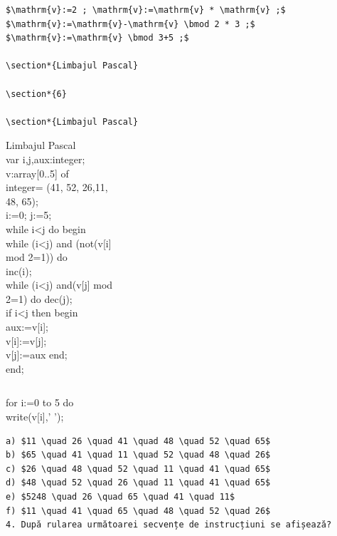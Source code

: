 \documentclass[10pt]{article}
\begin{document}
\begin{verbatim}
$\mathrm{v}:=2 ; \mathrm{v}:=\mathrm{v} * \mathrm{v} ;$
$\mathrm{v}:=\mathrm{v}-\mathrm{v} \bmod 2 * 3 ;$
$\mathrm{v}:=\mathrm{v} \bmod 3+5 ;$

\section*{Limbajul Pascal}

\section*{6}

\section*{Limbajul Pascal}
\end{verbatim}

Limbajul Pascal\\
var i,j,aux:integer;\\[0pt]
v:array[0..5] of\\
integer= (41, 52, 26,11,\\
48, 65);\\
i:=0; j:=5;\\
while i<j do begin\\[0pt]
while (i<j) and (not(v[i]\\
mod 2=1)) do\\
inc(i);\\[0pt]
while (i<j) and(v[j] mod\\
2=1) do dec(j);\\
if i<j then begin\\[0pt]
aux:=v[i];\\[0pt]
v[i]:=v[j];\\[0pt]
v[j]:=aux end;\\
end;

\begin{verbatim}

\end{verbatim}

for i:=0 to 5 do\\[0pt]
write(v[i],' ');

\begin{verbatim}
a) $11 \quad 26 \quad 41 \quad 48 \quad 52 \quad 65$
b) $65 \quad 41 \quad 11 \quad 52 \quad 48 \quad 26$
c) $26 \quad 48 \quad 52 \quad 11 \quad 41 \quad 65$
d) $48 \quad 52 \quad 26 \quad 11 \quad 41 \quad 65$
e) $5248 \quad 26 \quad 65 \quad 41 \quad 11$
f) $11 \quad 41 \quad 65 \quad 48 \quad 52 \quad 26$
4. După rularea următoarei secvențe de instrucțiuni se afișează?
\end{verbatim}
\end{document}
